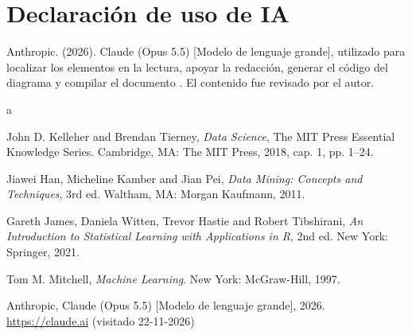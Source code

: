 \documentclass[12pt]{article}
\begin{document}
\newpage
\section*{Declaración de uso de IA}
Anthropic. (2026). Claude (Opus 5.5) [Modelo de lenguaje grande], utilizado para localizar los elementos en la lectura, apoyar la redacción, generar el código del diagrama y compilar el documento \cite{5}. El contenido fue revisado por el autor.

\begin{thebibliography}{a}

John D. Kelleher and Brendan Tierney, \emph{Data Science}, The MIT Press Essential Knowledge Series. Cambridge, MA: The MIT Press, 2018, cap. 1, pp. 1--24.

Jiawei Han, Micheline Kamber and Jian Pei, \emph{Data Mining: Concepts and Techniques}, 3rd ed. Waltham, MA: Morgan Kaufmann, 2011.

Gareth James, Daniela Witten, Trevor Hastie and Robert Tibshirani, \emph{An Introduction to Statistical Learning with Applications in R}, 2nd ed. New York: Springer, 2021.

Tom M. Mitchell, \emph{Machine Learning}. New York: McGraw-Hill, 1997.

Anthropic, Claude (Opus 5.5) [Modelo de lenguaje grande], 2026. \\ \url{https://claude.ai} (visitado 22-11-2026)

\end{thebibliography}
\end{document}
